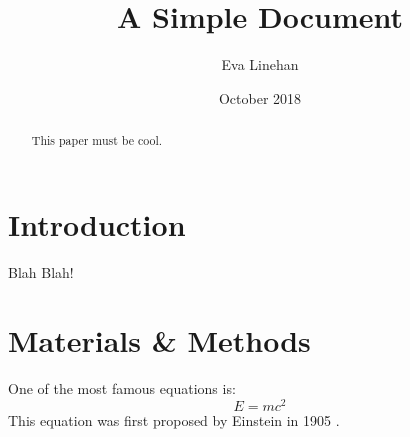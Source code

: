 \documentclass[12pt]{article}
\title{A Simple Document}
\author{Eva Linehan}
\date{October 2018}
\begin{document}
  \maketitle

  \begin{abstract}
  This paper must be cool.
  \end{abstract}
  
  \section{Introduction}
  Blah Blah!
  
  \section{Materials \& Methods}
  One of the most famous equations is:
  \begin{equation}
      E = mc^2
  \end{equation}
  This equation was first proposed by Einstein in 1905
  \cite{einstein1905does}.
  
  
  
\end{document}

